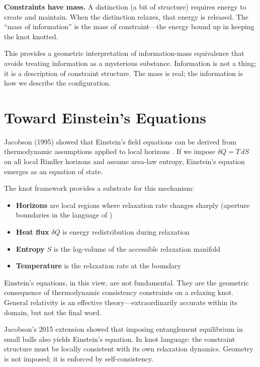 \documentclass[11pt,a4paper]{article}
\begin{document}
\textbf{Constraints have mass.} A distinction (a bit of structure) requires energy to create and maintain. When the distinction relaxes, that energy is released. The ``mass of information'' is the mass of constraint---the energy bound up in keeping the knot knotted.

This provides a geometric interpretation of information-mass equivalence that avoids treating information as a mysterious substance. Information is not a thing; it is a description of constraint structure. The mass is real; the information is how we describe the configuration.

\section{Toward Einstein's Equations}

Jacobson (1995) showed that Einstein's field equations can be derived from thermodynamic assumptions applied to local horizons \cite{jacobson1995}. If we impose $\delta Q = T\,dS$ on all local Rindler horizons and assume area-law entropy, Einstein's equation emerges as an equation of state.

The knot framework provides a substrate for this mechanism:
\begin{itemize}
    \item \textbf{Horizons} are local regions where relaxation rate changes sharply (aperture boundaries in the language of \cite{todd2025aperture})
    \item \textbf{Heat flux} $\delta Q$ is energy redistribution during relaxation
    \item \textbf{Entropy} $S$ is the log-volume of the accessible relaxation manifold
    \item \textbf{Temperature} is the relaxation rate at the boundary
\end{itemize}

Einstein's equations, in this view, are not fundamental. They are the geometric consequence of thermodynamic consistency constraints on a relaxing knot. General relativity is an effective theory---extraordinarily accurate within its domain, but not the final word.

Jacobson's 2015 extension \cite{jacobson2016} showed that imposing entanglement equilibrium in small balls also yields Einstein's equation. In knot language: the constraint structure must be locally consistent with its own relaxation dynamics. Geometry is not imposed; it is enforced by self-consistency.
\end{document}

